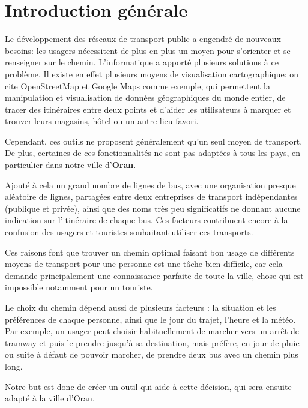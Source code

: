 \renewcommand\labelitemi{$\bullet$}
\renewcommand\labelitemii{$\circ$}
\chapter{Introduction générale}

Le développement des réseaux de transport public a engendré de nouveaux besoins: les usagers nécessitent de plus en plus un moyen pour s'orienter et se renseigner sur le chemin.\newline
L'informatique a apporté plusieurs solutions à ce problème. Il existe en effet plusieurs moyens de visualisation cartographique: on cite OpenStreetMap et Google Maps comme exemple, qui permettent la manipulation et visualisation de données géographiques du monde entier, de tracer des itinéraires entre deux points et d'aider les utilisateurs à marquer et trouver leurs magasins, hôtel ou un autre lieu favori.


Cependant, ces outils ne proposent généralement qu'un seul moyen de transport. De plus, certaines de ces fonctionnalités ne sont pas adaptées à tous les pays, en particulier dans notre ville d'\textbf{Oran}. 

Ajouté à cela un grand nombre de lignes de bus, avec une organisation presque aléatoire de lignes, partagées entre deux entreprises de transport indépendantes (publique et privée), ainsi que des noms très peu significatifs ne donnant aucune indication sur l'itinéraire de chaque bus.\newline
Ces facteurs contribuent encore à la confusion des usagers et touristes souhaitant utiliser ces transports.

Ces raisons font que trouver un chemin optimal faisant bon usage de différents moyens de transport pour une personne est une tâche bien difficile, car cela demande principalement une connaissance parfaite de toute la ville, chose qui est impossible notamment pour un touriste. 

Le choix du chemin dépend aussi de plusieurs facteurs : la situation et les préférences de chaque personne, ainsi que le jour du trajet, l'heure et la météo. Par exemple, un usager peut choisir habituellement de marcher vers un arrêt de tramway et
puis le prendre jusqu'à sa destination, mais préfère, en jour de pluie ou suite à défaut de pouvoir marcher, de prendre deux bus avec un chemin plus long.

Notre but est donc de créer un outil qui aide à cette décision, qui sera ensuite adapté à la ville d'Oran.


